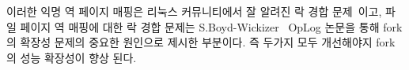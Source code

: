 
이러한 익명 역 페이지 매핑은 리눅스 커뮤니티에서 잘 알려진 락 경합
문제~\cite{Andi2011adding}이고, 파일 페이지 역 매핑에 대한 락
경합 문제는 S.Boyd-Wickizer~\cite{SilasBoydWickizerPth} OpLog 논문을 통해
 fork의 확장성 문제의 중요한 원인으로 제시한 부분이다.
즉 두가지 모두 개선해야지 fork의 성능 확장성이 향상 된다. 



